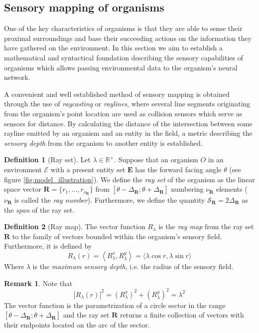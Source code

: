 \documentclass[a4paper, 12pt]{report}
\theoremstyle{definition}
\newtheorem{definition}{Definition}[chapter]
\newtheorem*{remark}{Remark}
\begin{document}
\subsection{Sensory mapping of organisms}
One of the key characteristics of organisms is that they are able to sense their proximal surroundings and base their succeeding actions on the information they
have gathered on the environment. In this section we aim to establish a mathematical and syntactical foundation describing the sensory capabilities of organisms
which allows passing environmental data to the organism's neural network.
\par A convenient and well established method of sensory mapping is obtained through the use of \emph{raycasting} or \emph{raylines}, where several line segments
originating from the organism's point location are used as collision sensors which serve as sensors for distance. By calculating the distance of the intersection between
some rayline emitted by an organism and an entity in the field, a metric describing the \emph{sensory depth} from the organism to another entity is established. 

\begin{definition}[Ray set]
    Let $\lambda \in \mathbb R^+$. Suppose that an organism $O$ in an environment $\mathscr E$ with a present entity set $\mathbf E$ has the forward
    facing angle $\theta$ (see figure \ref{fig:model_illustration}). We define the \emph{ray set} of the organism as the linear space vector $\mathbf R = \{r_1, \ldots, r_{\nu_{\mathbf R}}\}$ from $\left[\theta - \Delta_{\mathbf R}; \theta + \Delta_{\mathbf R}\right]$
    numbering $\nu_{\mathbf R}$ elements ($\nu_{\mathbf R}$ is called the \emph{ray number}). Furthermore, we define the quantity $\mathcal S_{\mathbf R} = 2 \Delta_{\mathbf R}$ as the \emph{span} of the ray set.
\end{definition}

\begin{definition}[Ray map]
   The vector function $R_{\lambda}$ is the \emph{ray map} from the ray set $\mathbf R$ to the family of vectors bounded within the organism's sensory field.
   Furthermore, it is defined by
   \[
        R_{\lambda}(r) = \left\langle R_\lambda^x, R_\lambda^y \right\rangle = \langle \lambda \cos r, \lambda \sin r \rangle
   \]
    Where $\lambda$ is the \emph{maximum sensory depth}, i.e. the radius of the sensory field.
\end{definition}

\begin{remark}
    Note that
    \[
        |R_\lambda(r)|^2 = \left(R_\lambda^x\right)^2 + \left(R_\lambda^y\right)^2 = \lambda^2
    \]
    The vector function is the parametrization of a circle sector in the range $\left[\theta - \Delta_{\mathbf R}; \theta + \Delta_{\mathbf R}\right]$
    and the ray set $\mathbf R$ returns a finite collection of vectors with their endpoints located on the arc of the sector.
\end{remark}
\end{document}
